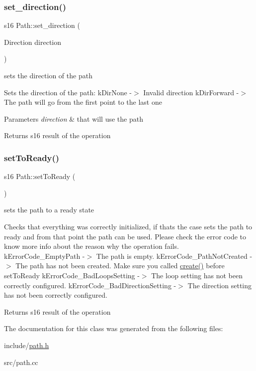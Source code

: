 \subsubsection{\texorpdfstring{set\+\_\+direction()}{set\_direction()}}
{\footnotesize\ttfamily s16 Path\+::set\+\_\+direction (\begin{DoxyParamCaption}\item[{Direction}]{direction }\end{DoxyParamCaption})}



sets the direction of the path 

Sets the direction of the path\+: k\+Dir\+None -\/$>$ Invalid direction k\+Dir\+Forward -\/$>$ The path will go from the first point to the last one


\begin{DoxyParams}{Parameters}
{\em direction} & that will use the path \\
\hline
\end{DoxyParams}
\begin{DoxyReturn}{Returns}
s16 result of the operation 
\end{DoxyReturn}
\mbox{\label{class_path_a8337c002364b617cec92d1d141592847}} 
\subsubsection{\texorpdfstring{set\+To\+Ready()}{setToReady()}}
{\footnotesize\ttfamily s16 Path\+::set\+To\+Ready (\begin{DoxyParamCaption}{ }\end{DoxyParamCaption})}



sets the path to a ready state 

Checks that everything was correctly initialized, if that\textquotesingle{}s the case sets the path to ready and from that point the path can be used. Please check the error code to know more info about the reason why the operation fails. k\+Error\+Code\+\_\+\+Empty\+Path -\/$>$ The path is empty. k\+Error\+Code\+\_\+\+Path\+Not\+Created -\/$>$ The path has not been created. Make sure you called \mbox{\hyperlink{class_path_a04a6c286852f3b7f53a187e25b38f3ec}{create()}} before set\+To\+Ready k\+Error\+Code\+\_\+\+Bad\+Loops\+Setting -\/$>$ The loop setting has not been correctly configured. k\+Error\+Code\+\_\+\+Bad\+Direction\+Setting -\/$>$ The direction setting has not been correctly configured.

\begin{DoxyReturn}{Returns}
s16 result of the operation 
\end{DoxyReturn}


The documentation for this class was generated from the following files\+:\begin{DoxyCompactItemize}
\item 
include/\mbox{\hyperlink{path_8h}{path.\+h}}\item 
src/path.\+cc\end{DoxyCompactItemize}
